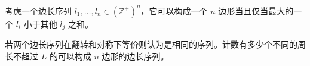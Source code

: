 \begin{example}[多边形计数]
    考虑一个边长序列 $l_1,\ldots,l_n\in (\mathbb Z^+)^n$，它可以构成一个 $n$ 边形当且仅当最大的一个 $l_i$ 小于其他 $l_j$ 之和。
    
    若两个边长序列在翻转和对称下等价则认为是相同的序列。计数有多少个不同的周长不超过 $L$ 的可以构成 $n$ 边形的边长序列。
\end{example}

